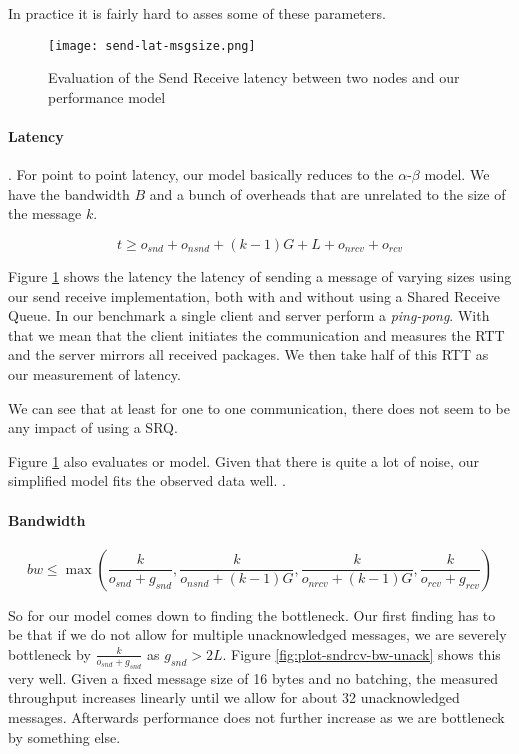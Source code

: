 In practice it is fairly hard to asses some of these parameters. 


\begin{figure}[h]
\texttt{[image: send-lat-msgsize.png]}
\caption{Evaluation of the Send Receive latency between two nodes and our performance model}
\label{fig:plot-sndrcv-lat}
\end{figure}

\paragraph{Latency} . For point to point latency, our model basically reduces to the $\alpha$-$\beta$ model. We
have the bandwidth $B$ and a bunch of overheads that are unrelated to the size of the message $k$.

$$
t \geq o_{snd} + o_{nsnd}  + (k-1)G + L + o_{nrcv} + o_{rcv}
$$

Figure \ref{fig:plot-sndrcv-lat} shows the latency the latency of sending a message of varying sizes using our send receive 
implementation, both with and without using a Shared Receive Queue. In our benchmark a single client and server 
perform a \emph{ping-pong}. With that we mean that the client initiates the communication and measures the RTT and the server
mirrors all received packages. We then take half of this RTT as our measurement of latency.

We can see that at least for one to one communication, there does not seem to be any impact of using a SRQ. 

Figure \ref{fig:plot-sndrcv-lat} also evaluates or model. Given that there is quite a lot of noise, our simplified model fits
the observed data well. . 

\paragraph{Bandwidth}


$$
bw \leq \max ( \frac{k}{o_{snd} + g_{snd}}, \frac{k}{o_{nsnd} + (k-1)G}, \frac{k}{o_{nrcv} + (k-1)G}, \frac{k}{o_{rcv} + g_{rcv}})
$$

So for our model comes down to finding the bottleneck. Our first finding has to be that if we do not allow for multiple 
unacknowledged messages, we are severely bottleneck by $\frac{k}{o_{snd} + g_{snd}}$ as $g_{snd} > 2L$. Figure 
\ref{fig:plot-sndrcv-bw-unack} shows this very well. Given a fixed message size of 16 bytes and no batching, the measured 
throughput increases linearly until we allow for about 32 unacknowledged messages. Afterwards performance does not further 
increase as we are bottleneck by something else. 

